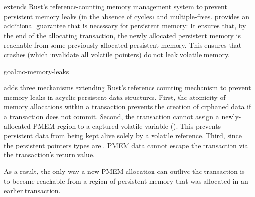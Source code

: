 \This{} extends Rust's reference-counting memory management system to prevent persistent memory
leaks (in the absence of cycles) and multiple-frees.
\This{} provides an additional guarantee that is necessary for persistent memory: It ensures that, by the end of the allocating transaction, the newly allocated persistent memory is reachable from some previously allocated persistent memory.  This ensures that crashes (which
invalidate all volatile pointers) do not leak volatile memory.

\begin{goaltrue}{goal:no-memory-leaks}

\This{} adds three mechanisms extending Rust's reference counting mechanism to prevent memory leaks in acyclic persistent data structures.
First, the atomicity of memory allocations within a transaction prevents the
creation of orphaned data if a transaction does not commit.  Second, the
transaction cannot assign a newly-allocated PMEM region to a captured volatile
variable ().  This prevents persistent data
from being kept alive solely by a volatile reference.  Third, since the
persistent pointers types are , PMEM data cannot escape the
transaction via the transaction's return value.

As a result, the only way a new PMEM allocation can outlive the transaction is
to become reachable from a region of persistent memory that was allocated
in an earlier transaction. 




\end{goaltrue}
